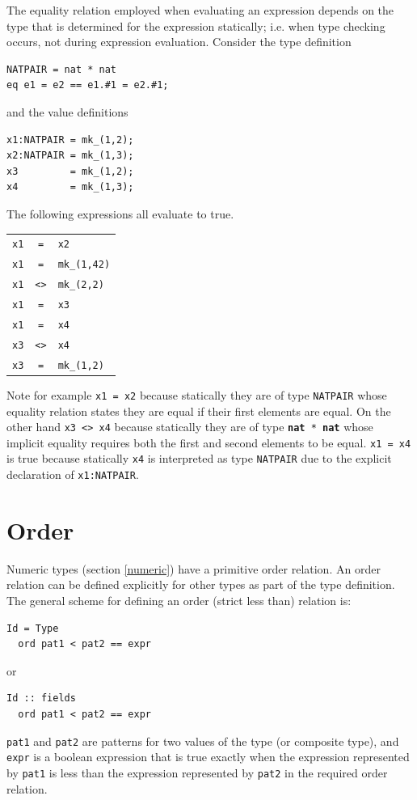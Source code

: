 \documentclass{overturerepchap}
\newcommand{\keyw}[1]{{\bf\ttfamily #1}}
\begin{document}
\begin{description}
The equality relation employed when evaluating an expression depends on the type that is determined for the expression statically; i.e. when type checking occurs, not during expression evaluation. 
Consider the type definition
\begin{lstlisting}
NATPAIR = nat * nat
eq e1 = e2 == e1.#1 = e2.#1;
\end{lstlisting}
and the value definitions
\begin{lstlisting}
x1:NATPAIR = mk_(1,2);
x2:NATPAIR = mk_(1,3);
x3         = mk_(1,2);
x4         = mk_(1,3);
\end{lstlisting}
The following expressions all evaluate to true.

\begin{tabular}{l c l}
{\tt x1} & {\tt=} & {\tt x2}\\
{\tt x1} & {\tt =} & {\tt mk\_(1,42)}\\
{\tt x1} & {\tt <>} & {\tt mk\_(2,2)}\\
{\tt  x1} & {\tt =} & {\tt x3}\\
{\tt x1} & {\tt =} & {\tt x4} \\
{\tt x3} & {\tt <>} & {\tt x4} \\
{\tt x3} & {\tt =} & {\tt mk\_(1,2)}\\
\end{tabular}

Note for example {\tt x1 = x2} because statically they are of type {\tt NATPAIR} whose equality relation states they are equal if their first elements are equal. 
On the other hand {\tt x3 <> x4} because statically they are of type {\tt  \keyw{nat} *  \keyw{nat}} whose implicit equality requires both the first and second elements to be equal.
{\tt x1 = x4} is true because statically {\tt x4} is interpreted as type {\tt NATPAIR} due to the explicit declaration of {\tt x1:NATPAIR}.
\end{description}

\section{Order}\label{ord}
Numeric types (section \ref{numeric}) have a primitive order relation.
An order relation can be defined explicitly for other types as part of the type definition.
The general scheme for defining an order (strict less than) relation is:
\begin{lstlisting}
Id = Type
  ord pat1 < pat2 == expr
\end{lstlisting}
or
\begin{lstlisting}
Id :: fields
  ord pat1 < pat2 == expr
\end{lstlisting}
{\tt pat1} and {\tt pat2} are patterns for two values of the type (or composite type), and {\tt expr} is a boolean expression that is true exactly when the expression represented by {\tt pat1} is less than the expression represented by {\tt pat2} in the required order relation.
\end{document}
